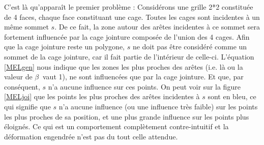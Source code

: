 C'est là qu'apparaît le premier problème : Considérons une grille 2*2
constituée de 4 faces, chaque face constituant une cage. Toutes les
cages sont incidentes à un même sommet $s$. De ce fait, la zone autour
des arêtes incidentes à ce sommet sera fortement influencée par la
cage jointure composée de l'union des 4 cages. Afin que la cage
jointure reste un polygone, $s$ ne doit pas être considéré comme un
sommet de la cage jointure, car il fait partie de l'intérieur de
celle-ci. L'équation \ref{MELgen} nous indique que les zones les plus
proches des arêtes (i.e. là ou la valeur de $\beta~$ vaut 1), ne sont
influencées que par la cage jointure. Et que, par conséquent, $s$ n'a
aucune influence sur ces points. On peut voir sur la figure
\ref{MELjoi} que les points les plus proches des arêtes incidentes à
$s$ sont en bleu, ce qui signifie que $s$ n'a aucune influence (ou une
influence très faible) sur les points les plus proches de sa position,
et une plus grande influence sur les points plus éloignés. Ce qui est
un comportement complètement contre-intuitif et la déformation
engendrée n'est pas du tout celle attendue.

